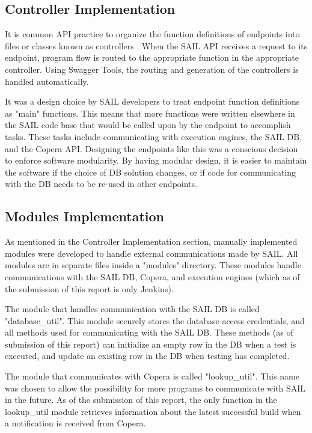 \documentclass[10pt, titlepage, onecolumn, openany]{article}
\begin{document}


\subsection{Controller Implementation}
It is common API practice to organize the function definitions of endpoints into
files or classes known as controllers \cite{webapicontrol}. When the SAIL API
receives a request to its endpoint, program flow is routed to the appropriate
function in the appropriate controller. Using Swagger Tools, the routing and
generation of the controllers is handled automatically.

It was a design choice by SAIL developers to treat endpoint function definitions
as "main" functions. This means that more functions were written elsewhere in the
SAIL code base that would be called upon by the endpoint to accomplish tasks.
These tasks include communicating with execution engines, the SAIL DB, and the
Copera API. Designing the endpoints like this was a conscious decision to enforce
software modularity. By having modular design, it is easier to maintain
the software if the choice of DB solution changes, or if code for communicating
with the DB needs to be re-used in other endpoints.

\subsection{Modules Implementation}
As mentioned in the Controller Implementation section, manually implemented
modules were developed to handle external communications made by SAIL. All
modules are in separate files inside a "modules" directory. These modules handle
communications with the SAIL DB, Copera, and execution engines (which as of the
submission of this report is only Jenkins).

The module that handles communication with the SAIL DB is called "database\_util".
This module securely stores the database access credentials, and all methods
used for communicating with the SAIL DB. These methods (as of submission of this
report) can initialize an empty row in the DB when a test is executed,
and update an existing row in the DB when testing has completed.

The module that communicates with Copera is called "lookup\_util". This name was
chosen to allow the possibility for more programs to communicate with SAIL in the
future. As of the submission of this report, the only function in the lookup\_util
module retrieves information about the latest successful build when a notification
is received from Copera.
\end{document}
